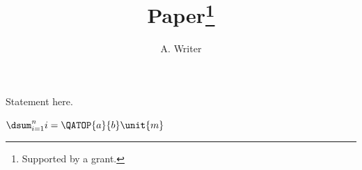 \documentclass{amsart}
\begin{document}
\title{Paper\thanks{Supported by a grant.}}
\author{A. Writer}
\maketitle
\address{Dept. of Math, Some University}
\begin{theorem}[Main]
Statement here.
\end{theorem}

$\dsum_{i=1}^n i = \QATOP{a}{b} \unit{m}$
\printindex
\end{document}
